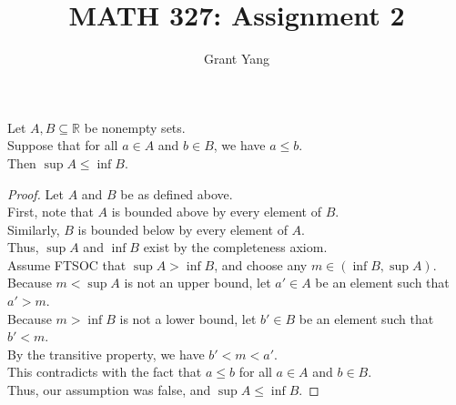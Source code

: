 \documentclass{article}
\newenvironment{theorem}[1]{\renewcommand\theinnercustomthm{#1}\innercustomthm}
  {\endinnercustomthm}
\begin{document}
\title{MATH 327: Assignment 2}
\author{Grant Yang}
\maketitle

\begin{theorem}{1}
Let $A,B \subseteq \mathbb R$ be nonempty sets. \\
Suppose that for all $a\in A$ and $b \in B$, we have $a \le b$.\\
Then $\sup A \le \inf  B$.
\end{theorem}
\begin{proof}
Let $A$ and $B$ be as defined above. \\
First, note that $A$ is bounded above by every element of $B$. \\
Similarly, $B$ is bounded below by every element of $A$. \\
Thus, $\sup A$ and $\inf B$ exist by the completeness axiom. \\
Assume FTSOC that $\sup A > \inf B$, and choose any $m \in (\inf B, \sup A)$. \\
Because $m < \sup A$ is not an upper bound, let $a' \in A$ be an element such that $a' > m$. \\
Because $m > \inf B$ is not a lower bound, let $b' \in B$ be an element such that $b' < m$. \\
By the transitive property, we have $b' < m < a'$. \\
This contradicts with the fact that $a \le b$ for all $a\in A$ and $b \in B$. \\
Thus, our assumption was false, and $\sup A \le \inf B$.
\end{proof}
\end{document}
